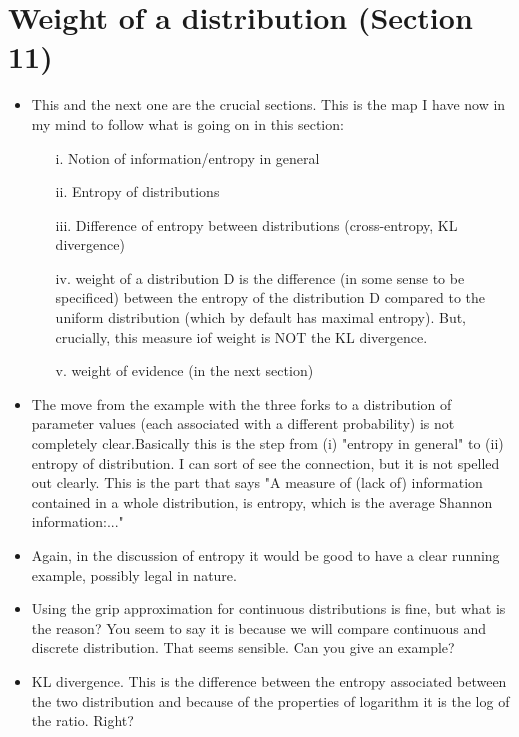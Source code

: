 \documentclass[
  10pt,
  dvipsnames,enabledeprecatedfontcommands]{scrartcl}
\begin{document}
\hypertarget{weight-of-a-distribution-section-11}{%
\section{Weight of a distribution (Section
11)}\label{weight-of-a-distribution-section-11}}

\begin{itemize}

\item This and the next one are the crucial sections. This is the map I have now in my mind to 
follow what is going on in this section: 


\begin{enumerate}
\item[i.] Notion of information/entropy in general
\item[ii.] Entropy of distributions
\item[iii.] Difference of entropy between distributions (cross-entropy, KL divergence)
\item[iv.] weight of a distribution D is the difference (in some sense to be specificed) between the entropy of the distribution D compared to the uniform distribution (which by default has maximal entropy). But, crucially, this measure iof weight is NOT the KL divergence. 
\item[v.] weight of evidence (in the next section)
\end{enumerate}

\item The move from the example with the three forks to
a distribution of parameter values (each associated with a different probability) 
is not completely clear.Basically this is the step from (i) "entropy in general" to
(ii) entropy of distribution. I can sort of see the connection, 
but it is not spelled out clearly. This is the part that says "A measure of (lack of) information contained in a whole distribution, is entropy, which is the average Shannon information:..."

\item Again, in the discussion of entropy it would be 
good to have a clear running example, possibly 
legal in nature. 

\item Using the grip approximation for continuous distributions is fine, 
but what is the reason? You seem to say it is because we will compare continuous 
and discrete distribution. That seems sensible. Can you give an example?

\item KL divergence. This is the difference between the entropy associated between the two distribution and because of the properties of logarithm it is the log of the ratio. Right?


\end{itemize}
\end{document}
